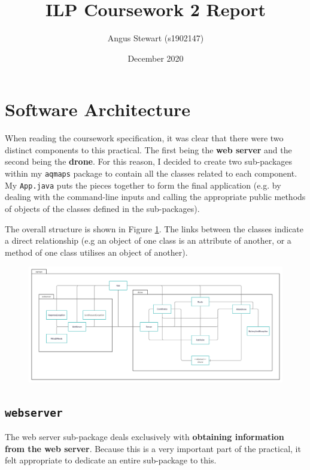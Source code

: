 \documentclass[11pt]{article}
\title{ILP Coursework 2 Report}
\author{Angus Stewart (s1902147)}
\date{December 2020}
\begin{document}
\maketitle

\tableofcontents

\newpage
{}

\section{Software Architecture}
When reading the coursework specification, it was clear that there were two distinct components to this practical. The first being the \textbf{web server} and the second being the \textbf{drone}. For this reason, I decided to create two sub-packages within my \texttt{aqmaps} package to contain all the classes related to each component. My \texttt{App.java} puts the pieces together to form the final application (e.g. by dealing with the command-line inputs and calling the appropriate public methods of objects of the classes defined in the sub-packages).

The overall structure is shown in Figure \ref{fig:uml}. The links between the classes indicate a direct relationship (e.g an object of one class is an attribute of another, or a method of one class utilises an object of another).
\begin{figure}[h]
    \centering
    \includegraphics[width=\textwidth]{uml-class-diagram}
    \label{fig:uml}
\end{figure}

\subsection{\texttt{webserver}}
The web server sub-package deals exclusively with \textbf{obtaining information from the web server}. Because this is a very important part of the practical, it felt appropriate to dedicate an entire sub-package to this.
\end{document}
